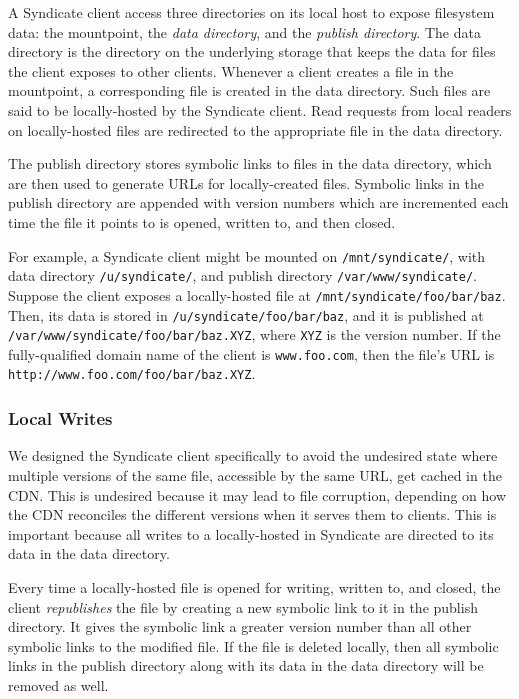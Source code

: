 A Syndicate client access three directories on its local host to expose
filesystem data:  the mountpoint, the \textit{data directory}, and the
\textit{publish directory}.  The data directory is the directory on the
underlying storage that keeps the data for files the client exposes to other clients.  Whenever
a client creates a file in the mountpoint, a corresponding file is created
in the data directory.  Such files are said to be locally-hosted by the Syndicate client.
Read requests from local readers on locally-hosted files are redirected to the
appropriate file in the data directory.

The publish directory stores symbolic links to
files in the data directory, which are then used to generate URLs for locally-created
files.  Symbolic links in the publish directory are appended with version numbers which 
are incremented each time the file it points to is opened, written to, and then closed.

For example, a Syndicate client might be mounted on \texttt{/mnt/syndicate/}, with data directory \texttt{/u/syndicate/}, and publish directory \texttt{/var/www/syndicate/}.  Suppose the client exposes a locally-hosted file at \texttt{/mnt/syndicate/foo/bar/baz}.  Then, its data is stored in \texttt{/u/syndicate/foo/bar/baz}, and it is published at \texttt{/var/www/syndicate/foo/bar/baz.XYZ}, where \texttt{XYZ} is the version number.  If the fully-qualified domain name of the client is \texttt{www.foo.com}, then the file's URL is \texttt{http://www.foo.com/foo/bar/baz.XYZ}.

\subsubsection{Local Writes}

We designed the Syndicate client specifically to avoid the undesired state where
multiple versions of the same file, accessible by the same URL, get cached in 
the CDN.  This is undesired because it may lead to file corruption, depending
on how the CDN reconciles the different versions when it serves them to clients.
This is important because all writes to a locally-hosted in Syndicate are directed to its data in the
data directory.

Every time a locally-hosted file is opened for writing, written to, and closed, the client
\textit{republishes} the file by creating a new symbolic link to it in the 
publish directory.  It gives the symbolic link a greater version number
than all other symbolic links to the modified file.  If the file is deleted locally,
then all symbolic links in the publish directory along with its data in the
data directory will be removed as well.

